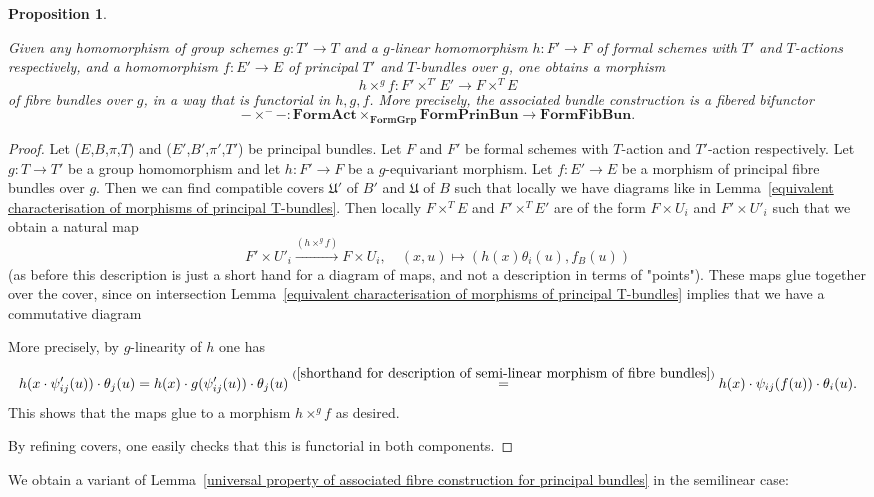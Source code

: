 \documentclass[10pt,oneside]{amsart}
\newtheorem{proposition}[theorem]{Proposition}
\theoremstyle{definition}
\begin{document}
	\begin{proposition}\label{associated bundle construction in the semi-linear case is a sort of fibered bifunctor}
		
		Given any homomorphism of group schemes $g:T'\rightarrow T$ and a $g$-linear homomorphism $h:F'\rightarrow F$ of formal schemes with $T'$ and $T$-actions respectively, and a homomorphism $f:E'\rightarrow E$ of principal $T'$ and $T$-bundles over $g$, one obtains a morphism
		\[h\times^g f : F'\times^{T'}E'\rightarrow F\times^T E\]
		of fibre bundles over $g$, in a way that is functorial in $h,g,f$. 
		More precisely, the associated bundle construction is a fibered bifunctor
		\[-\times^{-}-: \mathbf{FormAct} \times_{\mathbf{FormGrp}} \mathbf{FormPrinBun}\rightarrow \mathbf{FormFibBun}. \]
	\end{proposition}
	\begin{proof}
		Let ($E$,$B$,$\pi$,$T$) and ($E'$,$B'$,$\pi'$,$T'$) be principal bundles. Let $F$ and $F'$ be formal schemes with $T$-action and $T'$-action respectively. Let $g:T\rightarrow T'$ be a group homomorphism and let $h:F'\rightarrow F$ be a $g$-equivariant morphism.
		Let $f:E'\rightarrow E$ be a morphism of principal fibre bundles over $g$.
		Then we can find compatible covers $\mathfrak U'$ of $B'$ and $\mathfrak U$ of $B$ such that locally we have diagrams like in Lemma~\ref{equivalent characterisation of morphisms of principal T-bundles}. Then locally $F\times^T E$ and $F'\times^T E'$ are of the form $F\times U_i$ and $F'\times U'_i$ such that we obtain a natural map
		\[F'\times U'_i\xrightarrow{(h\times^g f)} F\times U_i, \quad (x,u)\mapsto (h(x)\theta_i(u),f_B(u))\]
		(as before this description is just a short hand for a diagram of maps, and not a description in terms of "points"). These maps glue together over the cover, since on intersection Lemma~\ref{equivalent characterisation of morphisms of principal T-bundles} implies that we have a commutative diagram
		\begin{center}
		\end{center}
		More precisely, by $g$-linearity of $h$ one has
		\[h(x\cdot\psi_{ij}'(u))\cdot \theta_j(u)  =  h(x)\cdot g(\psi_{ij}'(u))\cdot \theta_j(u)  \stackrel{(\ref{shorthand for description of semi-linear morphism of fibre  bundles})}{=} h(x)\cdot \psi_{ij}(f(u))\cdot \theta_i(u).\]
		This shows that the maps glue to a morphism $h\times^g f$ as desired.
		
		By refining covers, one easily checks that this is functorial in both components.
	\end{proof}
	We obtain a variant of Lemma~\ref{universal property of associated fibre construction for principal bundles} in the semilinear case:
	
\end{document}
